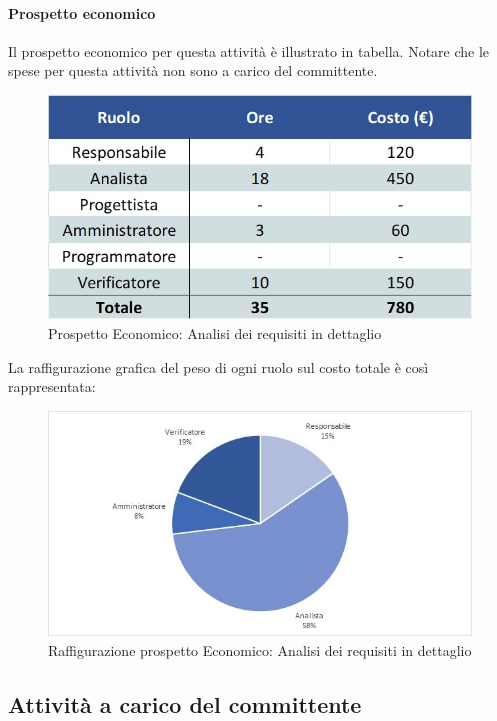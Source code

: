 \paragraph{Prospetto economico}
Il prospetto economico per questa attività è illustrato in tabella. Notare che le spese per questa attività non sono a carico del committente.
\begin{figure}[h!]
	\centerline{\includegraphics[scale=0.4]{img/Preventivo/AnalisiRequisitiDettaglio.Economico.jpg}}
	\caption{Prospetto Economico: Analisi dei requisiti in dettaglio}
\end{figure}
La raffigurazione grafica del peso di ogni ruolo sul costo totale è così rappresentata: 
\begin{figure}[h!]
	\centerline{\includegraphics[scale=0.4]{img/Preventivo/Torte/AnalisiRequisitiDettaglio.jpg}}
	\caption{Raffigurazione prospetto Economico: Analisi dei requisiti in dettaglio}
\end{figure}

\subsection{Attività a carico del committente}
